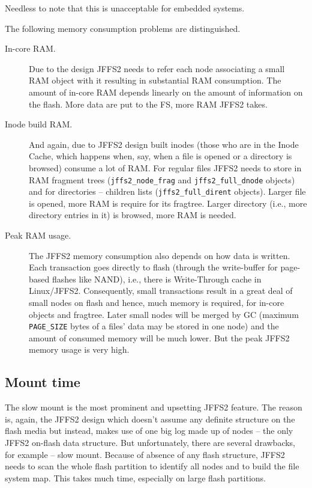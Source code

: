 \documentclass[12pt,a4paper,oneside,titlepage]{article}
\begin{document}
Needless to note that this is unacceptable for embedded systems.

The following memory consumption problems are distinguished.
\begin{description}
\item[In-core RAM.] 
Due to the design JFFS2 needs to refer each node associating a
small RAM object with it resulting in substantial RAM consumption. The
amount of \mbox{in-core} RAM depends linearly on the amount of information on
the flash. More data are put to the FS, more RAM JFFS2 takes.

\item[Inode build RAM.] And again, due to JFFS2 design built inodes (those who
are in the Inode Cache, which happens when, say, when a file is opened or
a directory is browsed) consume a lot of RAM. For regular files JFFS2 needs to
store in RAM fragment trees (\texttt{jffs2\_node\_frag} and
\texttt{jffs2\_full\_dnode} objects) and for directories -- children
lists (\texttt{jffs2\_full\_dirent} objects). Larger file is opened, more
RAM is require for its fragtree. Larger directory (i.e., more directory
entries in it) is browsed, more RAM is needed.

\item[Peak RAM usage.] The JFFS2 memory consumption also depends on how data is
written. Each transaction goes directly to flash (through the
\mbox{write-buffer} for \mbox{page-based} flashes like NAND), i.e., there is
\mbox{Write-Through} cache in Linux/JFFS2. Consequently, small transactions
result in a great deal of small nodes on flash and hence, much memory is required,
for \mbox{in-core} objects and fragtree. Later small nodes will be merged by
GC (maximum \texttt{PAGE\_SIZE} bytes of a files' data may be stored in
one node) and the amount of consumed memory will be much lower. But the peak
JFFS2 memory usage is very high.
\end{description}

%
%
\subsection{Mount time}
The slow mount is the most prominent and upsetting JFFS2 feature. The
reason is, again, the JFFS2 design which doesn't assume any definite
structure on the flash media but instead, makes use of one big log made
up of nodes -- the only JFFS2 \mbox{on-flash} data structure. 
But unfortunately, there are several drawbacks, for example -- slow mount.
Because of absence of any flash structure, JFFS2 needs to scan the whole
flash partition to identify all nodes and to build the file system map. This
takes much time, especially on large flash partitions.
\end{document}
